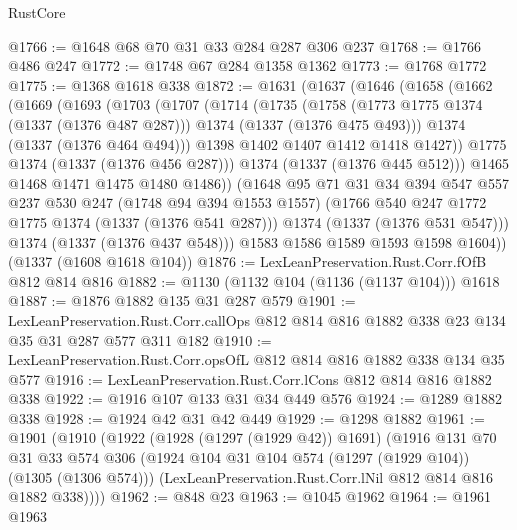 \begin{lexlean}{RustCore}
\begin{coremodule}
@1766 := @1648 @68 @70 @31 @33 @284 @287 @306 @237
@1768 := @1766 @486 @247
@1772 := @1748 @67 @284 @1358 @1362
@1773 := @1768 @1772
@1775 := @1368 @1618 @338
@1872 := @1631
    (@1637
      (@1646
        (@1658
          (@1662
            (@1669
              (@1693
                (@1703
                  (@1707
                    (@1714
                      (@1735
                        (@1758
                          (@1773 @1775 @1374 (@1337 (@1376 @487 @287)))
                          @1374
                          (@1337 (@1376 @475 @493)))
                        @1374
                        (@1337 (@1376 @464 @494)))
                      @1398
                      @1402
                      @1407
                      @1412
                      @1418
                      @1427))
                  @1775
                  @1374
                  (@1337 (@1376 @456 @287)))
                @1374
                (@1337 (@1376 @445 @512)))
              @1465
              @1468
              @1471
              @1475
              @1480
              @1486))
          (@1648
            @95
            @71
            @31
            @34
            @394
            @547
            @557
            @237
            @530
            @247
            (@1748 @94 @394 @1553 @1557)
            (@1766 @540 @247 @1772 @1775 @1374 (@1337 (@1376 @541 @287)))
            @1374
            (@1337 (@1376 @531 @547)))
          @1374
          (@1337 (@1376 @437 @548)))
        @1583
        @1586
        @1589
        @1593
        @1598
        @1604))
    (@1337 (@1608 @1618 @104))
@1876 := LexLeanPreservation.Rust.Corr.fOfB @812 @814 @816
@1882 := @1130 (@1132 @104 (@1136 (@1137 @104))) @1618
@1887 := @1876 @1882 @135 @31 @287 @579
@1901 := LexLeanPreservation.Rust.Corr.callOps
    @812
    @814
    @816
    @1882
    @338
    @23
    @134
    @35
    @31
    @287
    @577
    @311
    @182
@1910 := LexLeanPreservation.Rust.Corr.opsOfL @812 @814 @816 @1882 @338 @134 @35 @577
@1916 := LexLeanPreservation.Rust.Corr.lCons @812 @814 @816 @1882 @338
@1922 := @1916 @107 @133 @31 @34 @449 @576
@1924 := @1289 @1882 @338
@1928 := @1924 @42 @31 @42 @449
@1929 := @1298 @1882
@1961 := @1901
    (@1910
      (@1922
        (@1928 (@1297 (@1929 @42)) @1691)
        (@1916
          @131
          @70
          @31
          @33
          @574
          @306
          (@1924 @104 @31 @104 @574 (@1297 (@1929 @104)) (@1305 (@1306 @574)))
          (LexLeanPreservation.Rust.Corr.lNil @812 @814 @816 @1882 @338))))
@1962 := @848 @23
@1963 := @1045 @1962
@1964 := @1961 @1963

\end{coremodule}
\end{lexlean}
